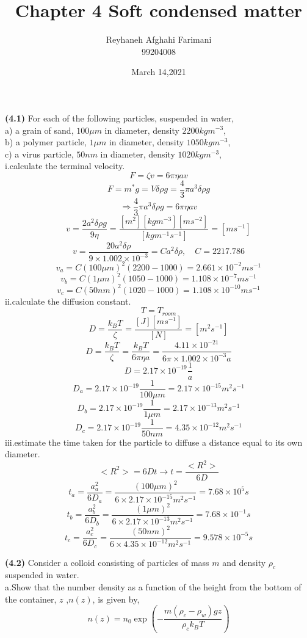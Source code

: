 \documentclass[a4paper,12pt]{report}
\title{\large{\textbf{Chapter 4 Soft condensed matter}}}
\author{Reyhaneh Afghahi Farimani\\ 99204008}
\date{March 14,2021}
\begin{document}
\maketitle
\textbf{(4.1)}
For each of the following particles, suspended in water,\\ a) a grain of sand, $100 \mu m$ in diameter, density $2200 kgm^{-3}$,\\ b) a polymer particle, $1 \mu m$ in diameter, density $1050 kgm^{-3}$,\\ c) a virus particle, $50 nm$ in diameter, density $1020 kgm^{-3}$,\\i.calculate the terminal velocity.
\[
F = \zeta v = 6\pi \eta a v
\]
\[
F = m^* g = V \delta \rho g = \frac{4}{3} \pi a^3 \delta \rho g
\]
\[
\Rightarrow \frac{4}{3} \pi a^3 \delta \rho g = 6\pi \eta a v
\]
\[
v = \frac{2a^2\delta \rho g}{9 \eta }=\frac{[m^2][kg m^{-3}][ m s^{-2}]}{[kg m^{-1} s^{-1}]}=[ms^{-1}]
\]
\[
v = \frac{20a^2\delta \rho }{9 \times 1.002 \times 10^{-3} }= Ca^2\delta \rho ,\quad C = 2217.786
\]
\[
v_a = C (100\mu m)^2 (2200 - 1000) = 2.661 \times 10^{-2} ms^{-1}
\]
\[
v_b = C (1\mu m)^2 (1050 - 1000) = 1.108\times 10^{-7} ms^{-1}
\]
\[
v_c = C (50n m)^2 (1020 - 1000) = 1.108\times 10^{-10} ms^{-1}
\]
ii.calculate the diffusion constant.
\[
T = T_{room}
\]
\[
D = \frac{k_BT}{\zeta} =\frac{[J][ms^{-1}]}{[N]} =[m^2s^{-1}]
\]
\[
D = \frac{k_BT}{\zeta} = \frac{k_BT}{6\pi \eta a} = \frac{4.11\times 10^{-21}}{6\pi \times 1.002 \times 10^{-3} a} 
\]
\[
D = 2.17\times 10^{-19} \frac{1}{a}
\]
\[
D_a = 2.17\times 10^{-19} \frac{1}{100 \mu m} = 2.17 \times 10^{-15}m^2s^{-1}
\]
\[
D_b = 2.17\times 10^{-19} \frac{1}{1 \mu m} = 2.17 \times 10^{-13}m^2s^{-1}
\]
\[
D_c = 2.17\times 10^{-19} \frac{1}{50 nm} = 4.35 \times 10^{-12}m^2s^{-1}
\]
iii.estimate the time taken for the particle to diffuse a distance equal to its own diameter.
\[
<R^2> = 6Dt \to t=\frac{<R^2>}{6D}
\]
\[
t_a = \frac{a_a^2}{6D_a}=\frac{(100 \mu m)^2}{6\times 2.17 \times 10^{-15}m^2s^{-1}} =7.68 \times 10^5 s
\]
\[
t_b = \frac{a_b^2}{6D_b} = \frac{(1 \mu m)^2}{6\times 2.17 \times 10^{-13}m^2s^{-1}}=7.68 \times 10^{-1} s
\]
\[
t_c = \frac{a_c^2}{6D_c}=\frac{(50 nm)^2}{6\times 4.35 \times 10^{-12}m^2s^{-1}}= 9.578\times 10^{-5}s
\]


\textbf{(4.2)} Consider a colloid consisting of particles of mass $m$ and density $\rho_c$ suspended in water.\\
a.Show that the number density as a function of the height from the bottom of the container, $z$ ,$n(z)$, is given by,
\[
n(z) = n_0\exp(-\frac{m(\rho_c - \rho_w)gz}{\rho_ck_BT})
\]
\end{document}
